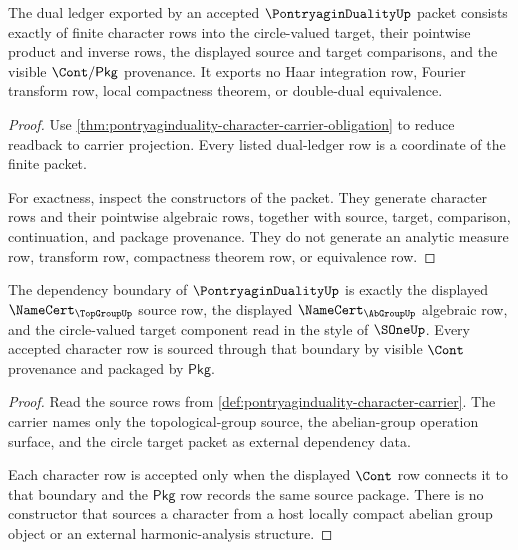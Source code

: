 \begin{theorem}
\label{thm:pontryaginduality-dual-ledger-exactness}
The dual ledger exported by an accepted $\PontryaginDualityUp$ packet consists
exactly of finite character rows into the circle-valued target, their
pointwise product and inverse rows, the displayed source and target
comparisons, and the visible $\Cont/\mathsf{Pkg}$ provenance. It exports no
Haar integration row, Fourier transform row, local compactness theorem, or
double-dual equivalence.
\end{theorem}
\begin{proof}
Use \autoref{thm:pontryaginduality-character-carrier-obligation} to reduce
readback to carrier projection. Every listed dual-ledger row is a coordinate of
the finite packet.

For exactness, inspect the constructors of the packet. They generate character
rows and their pointwise algebraic rows, together with source, target,
comparison, continuation, and package provenance. They do not generate an
analytic measure row, transform row, compactness theorem row, or equivalence
row.
\end{proof}

\begin{theorem}
\label{thm:pontryaginduality-source-boundary}
The dependency boundary of $\PontryaginDualityUp$ is exactly the displayed
$\NameCert_{\TopGroupUp}$ source row, the displayed
$\NameCert_{\AbGroupUp}$ algebraic row, and the circle-valued target component
read in the style of $\SOneUp$. Every accepted character row is sourced through
that boundary by visible $\Cont$ provenance and packaged by $\mathsf{Pkg}$.
\end{theorem}
\begin{proof}
Read the source rows from
\autoref{def:pontryaginduality-character-carrier}. The carrier names only the
topological-group source, the abelian-group operation surface, and the circle
target packet as external dependency data.

Each character row is accepted only when the displayed $\Cont$ row connects it
to that boundary and the $\mathsf{Pkg}$ row records the same source package.
There is no constructor that sources a character from a host locally compact
abelian group object or an external harmonic-analysis structure.
\end{proof}

